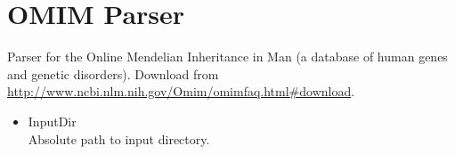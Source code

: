     
    
    
\section{OMIM Parser}
Parser for the Online Mendelian Inheritance in Man (a database of human genes and genetic disorders).
Download from \url{http://www.ncbi.nlm.nih.gov/Omim/omimfaq.html#download}.
\begin{itemize}
  \item{InputDir}\\
  Absolute path to input directory. 
\end{itemize}
    
